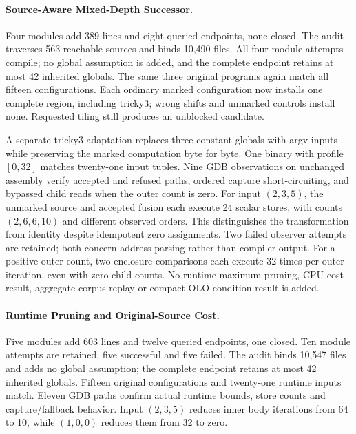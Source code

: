 \paragraph{Source-Aware Mixed-Depth Successor.}
Four modules add 389 lines and eight queried endpoints, none closed. The audit
traverses 563 reachable sources and binds 10,490 files. All four module attempts
compile; no global assumption is added, and the complete endpoint retains at
most 42 inherited globals. The same three original programs again match all
fifteen configurations. Each ordinary marked configuration now installs one
complete region, including tricky3; wrong shifts and unmarked controls install
none. Requested tiling still produces an unblocked candidate.

A separate tricky3 adaptation replaces three constant globals with argv inputs
while preserving the marked computation byte for byte. One binary with profile
$[0,32]$ matches twenty-one input tuples. Nine GDB observations on unchanged
assembly verify accepted and refused paths, ordered capture short-circuiting,
and bypassed child reads when the outer count is zero. For input $(2,3,5)$,
the unmarked source and accepted fusion each execute 24 scalar stores, with
counts $(2,6,6,10)$ and different observed orders. This distinguishes the
transformation from identity despite idempotent zero assignments. Two failed
observer attempts are retained; both concern address parsing rather than
compiler output. For a positive outer count, two enclosure comparisons each
execute 32 times per outer iteration, even with zero child counts. No runtime
maximum pruning, CPU cost result, aggregate corpus replay or compact OLO
condition result is added.

\paragraph{Runtime Pruning and Original-Source Cost.}
Five modules add 603 lines and twelve queried endpoints, one closed. Ten
module attempts are retained, five successful and five failed. The audit binds
10,547 files and adds no global assumption; the complete endpoint retains at
most 42 inherited globals. Fifteen original configurations and twenty-one
runtime inputs match. Eleven GDB paths confirm actual runtime bounds, store
counts and capture/fallback behavior. Input $(2,3,5)$ reduces inner body
iterations from 64 to 10, while $(1,0,0)$ reduces them from 32 to zero.

